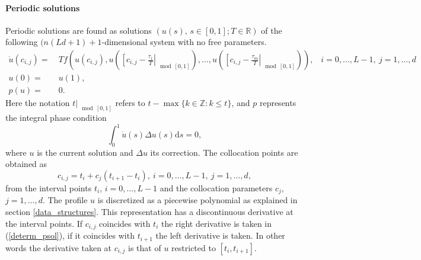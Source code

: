 \documentclass[10pt]{scrartcl}
\renewcommand{\d}{\mathrm{d}}
\newcommand{\RR}{\mathbb{R}}
\newcommand{\ZZ}{\mathbb{Z}}
\begin{document}
{\paragraph{Periodic solutions}
Periodic solutions are found as solutions $(u(s),\,s\in[0,1];T\in\RR)$
of the following $(n(Ld+1)+1$-dimensional system with no free
parameters.
\begin{equation}\label{determ_psol}
\begin{aligned}
\dot{u}(c_{i,j})=&\
Tf\left(u(c_{i,j}),u\left(\left[c_{i,j}-\frac{\tau_1}{T}\right\vert_{\mod[0,1]}\right),\ldots,
u\left(\left[c_{i,j}-\frac{\tau_m}{T}\right\vert_{\mod[0,1]}\right)\right)\mbox{,}\quad %
i=0,\ldots,L-1,\ j=1,\ldots,d \\
u(0)=&\ u(1), \\
p(u)=&\ 0.
\end{aligned}
\end{equation}
Here the notation $t\vert_{\mod[0,1]}$ refers to
$t-\max\{k\in\ZZ:k\leq t\}$, and $p$ represents the integral phase
condition
\begin{equation}\label{integral_phase_cond}
\int_0^1\dot{u}(s)\Delta u(s)\d s=0,
\end{equation}
where $u$ is the current solution and $\Delta u$ its correction.
The collocation points are obtained as 
\[
c_{i,j}=t_i+c_j(t_{i+1}-t_i),\ i=0,\ldots,L-1,\ j=1,\ldots,d,
\]
from the interval points $t_i$, $i=0,\ldots,L-1$ and the collocation
parameters $c_j$, $j=1,\ldots,d$.  The profile $u$ is discretized as a
piecewise polynomial as explained in section \ref{data_structures}.
This representation has a discontinuous derivative at the interval
points. If $c_{i,j}$ coincides with $t_i$ the right derivative is
taken in (\ref{determ_psol}), if it coincides with $t_{i+1}$ the left
derivative is taken. In other words the derivative taken at $c_{i,j}$
is that of $u$ restricted to $[t_i,t_{i+1}]$.

}
\end{document}
